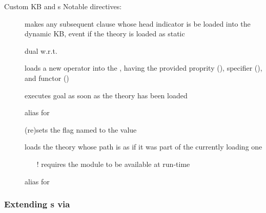 \documentclass[handout]{beamer}
\begin{document}
\begin{frame}[allowframebreaks]{Custom KB and s}
    Notable directives:
    \begin{description}
        \item[] makes any subsequent clause whose head indicator is  be loaded into the \alert{dynamic} KB, event if the theory is loaded as static
        \item[] dual w.r.t. 
        \item[] loads a new operator into the , having the provided proprity (), specifier (), and functor ()
        \item[] executes goal  as soon as the theory has been loaded
        \item[] alias for 
        \item[] (re)sets the flag named  to the value 
        \item[] loads the theory whose path is  as if it was part of the currently loading one
        \begin{itemize}\small
            \item[!] requires the  module to be available at run-time 
        \end{itemize} 
        \item[] alias for  
    \end{description}

    \framebreak

\end{frame}

\subsubsection{Extending s via }
\end{document}
